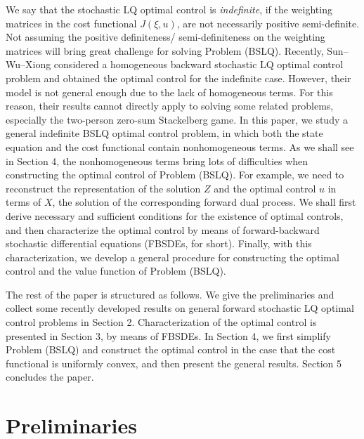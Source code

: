 \documentclass[11pt,times,twoside]{article}
\def\ms{\medskip}         \def\da{\mathop{\downarrow}}       \def\rt{\right}
\begin{document}
We say that the stochastic LQ optimal control is {\it indefinite}, if the weighting matrices in the cost functional $J(\xi,u)$,
are not necessarily positive semi-definite.
Not assuming the positive definiteness/ semi-definiteness on the weighting matrices will bring great challenge
for solving Problem (BSLQ).
Recently, Sun--Wu--Xiong \cite{Sun-Wu-Xiong2021} considered a homogeneous backward stochastic LQ optimal control problem
and obtained the optimal control for the indefinite case.
However, their model is not general enough due to the lack of homogeneous terms.
For this reason, their results cannot directly apply to solving some related problems, especially the two-person
zero-sum Stackelberg game.
%
In this paper, we study a general indefinite BSLQ optimal control problem, in which both the state equation and
the cost functional contain nonhomogeneous terms.
As we shall see in Section 4, the nonhomogeneous terms bring lots of difficulties when constructing the optimal
control of Problem (BSLQ).
For example, we need to reconstruct the representation of the solution $Z$ and the optimal control $u$ in terms
of $X$, the solution of the corresponding forward dual process.
%
We shall first derive necessary and sufficient conditions for the existence of optimal controls,
and then characterize the optimal control by means of forward-backward stochastic differential equations
(FBSDEs, for short).
Finally, with this characterization, we develop a general procedure for constructing the optimal control
and the value function of Problem (BSLQ).

\ms

The rest of the paper is structured as follows.
We give the preliminaries and collect some recently developed results on general forward stochastic LQ optimal
control problems in Section 2. Characterization of the optimal control is presented in Section 3,
by means of FBSDEs.
In Section 4, we first simplify Problem (BSLQ) and construct the optimal control in the case that the cost functional
is uniformly convex, and then present the general results.
Section 5 concludes the paper.


\section{Preliminaries}
\end{document}
